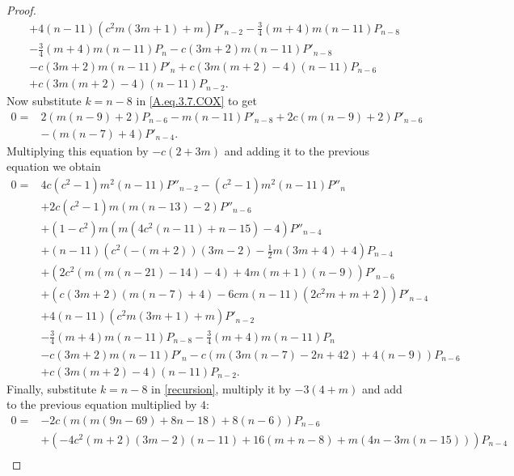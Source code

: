 \documentclass[review,nopreprintline]{elsarticle}
\theoremstyle{definition}
\numberwithin{equation}{section}
\theoremstyle{remark}
\begin{document}
\begin{proof}
\begin{align}
	            &+4 (n-11) \left(c^2 m (3 m+1)+m\right) P'_{n-2} -\frac{3}{4} (m+4) m (n-11) P_{n-8} \nonumber\\
	            &-\frac{3}{4} (m+4) m (n-11) P_n -c (3 m+2) m (n-11) P'_{n-8} \nonumber\\
	            &-c (3 m+2) m (n-11)  P'_n +c (3 m (m+2)-4) (n-11) P_{n-6} \nonumber\\
	            &+c (3 m (m+2)-4) (n-11) P_{n-2} .
	        \end{align}
	        Now substitute $k=n-8$ in \eqref{A.eq.3.7.COX} to get
	        \begin{align}
	            0=&2 (m (n-9)+2) P_{n-6} -m (n-11) P'_{n-8} +2 c (m (n-9)+2) P'_{n-6} \nonumber\\
	            &-(m (n-7)+4) P'_{n-4} .
	        \end{align}
	        Multiplying this equation by $-c (2+3 m)$ and adding it to the previous equation we obtain 
	        \begin{align*}
	            0=&4 c \left(c^2-1\right) m^2 (n-11) P''_{n-2} -\left(c^2-1\right) m^2 (n-11) P''_n \\
	            &+2 c \left(c^2-1\right) m (m (n-13)-2) P''_{n-6} \\
	            &+\left(1-c^2\right) m \left(m \left(4 c^2 (n-11)+n-15\right)-4\right) P''_{n-4} \\
	            &+(n-11) \left(c^2 (-(m+2)) (3 m-2)-\frac{1}{2} m (3 m+4)+4\right) P_{n-4} \\
	            &+\left(2 c^2 (m (m (n-21)-14)-4)+4 m (m+1) (n-9)\right) P'_{n-6} \\
	            &+\left(c (3 m+2) (m (n-7)+4)-6 c m (n-11) \left(2 c^2 m+m+2\right)\right) P'_{n-4} \\
	            &+4 (n-11) \left(c^2 m (3 m+1)+m\right) P'_{n-2} \\
	            &-\frac{3}{4} (m+4) m (n-11) P_{n-8} -\frac{3}{4} (m+4) m (n-11) P_n \\
	            &-c (3 m+2) m (n-11)  P'_n -c (m (3 m (n-7)-2 n+42)+4 (n-9)) P_{n-6} \\
	            &+c (3 m (m+2)-4) (n-11) P_{n-2}.
	        \end{align*}
	        Finally, substitute $k=n-8$ in \eqref{recursion}, multiply it by $-3 (4+m)$ and add  to the previous equation multiplied by $4$:
	        \begin{align*}
	            0=&-2 c (m (m (9 n-69)+8 n-18)+8 (n-6)) P_{n-6} \\
	            &+\left(-4 c^2 (m+2) (3 m-2) (n-11)+16 (m+n-8)+m (4 n-3 m (n-15))\right) P_{n-4} \\

\end{align*}
\end{proof}
\end{document}
